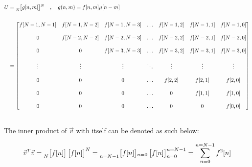 \documentclass{article}
\begin{document}
\begin{align*}
    U&= \prescript{}{N}{\begin{bmatrix} g[n, m] \end{bmatrix}}^{N} \quad , \quad g(n, m) = f[n, m]\mu[n - m] \\ \\
     &= \begin{bmatrix}
            f[N - 1, N - 1] & f[N - 1, N - 2] & f[N - 1, N - 3] & \ldots & f[N - 1, 2] & f[N - 1, 1] & f[N - 1, 0] \\ \\
                          0 & f[N - 2, N - 2] & f[N - 2, N - 3] & \ldots & f[N - 2, 2] & f[N - 2, 1] & f[N - 2, 0] \\ \\
                          0 &               0 & f[N - 3, N - 3] & \ldots & f[N - 3, 2] & f[N - 3, 1] & f[N - 3, 0] \\ \\
                     \vdots &          \vdots &          \vdots & \ddots &      \vdots &      \vdots &      \vdots \\ \\
                          0 &               0 &               0 & \ldots & f[    2, 2] & f[    2, 1] & f[    2, 0] \\ \\
                          0 &               0 &               0 & \ldots &           0 & f[    1, 1] & f[    1, 0] \\ \\
                          0 &               0 &               0 & \ldots &           0 &           0 & f[    0, 0]
          \end{bmatrix} \\ \\
  \end{align*}

The inner product of $\vec{v}$ with itself can be denoted as such below:

\begin{align*}
    \vec{v}^{T}\vec{v} = \prescript{}{N}{\begin{bmatrix} f[n] \end{bmatrix}}\begin{bmatrix} f[n] \end{bmatrix}^{N}
                       = \prescript{}{n = N - 1}{\begin{bmatrix} f[n] \end{bmatrix}}_{n = 0}\begin{bmatrix} f[n] \end{bmatrix}^{n = N - 1}_{n = 0} = \sum^{n = N - 1}_{n = 0}f^{2}[n] \\ \\
  \end{align*}
\end{document}
